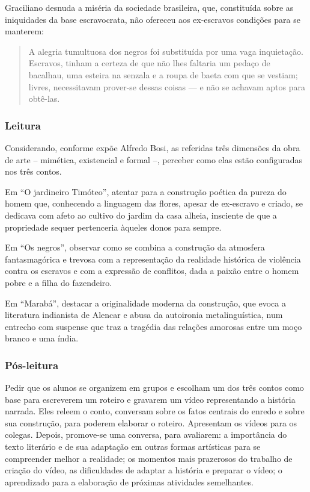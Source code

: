 \documentclass[12pt]{extarticle}
\begin{document}
Graciliano desnuda a miséria da sociedade brasileira, que, constituída
sobre as iniquidades da base escravocrata, não ofereceu aos ex-escravos
condições para se manterem:

\begin{quote}
A alegria tumultuosa dos negros foi substituída por uma vaga
inquietação. Escravos, tinham a certeza de que não lhes faltaria um
pedaço de bacalhau, uma esteira na senzala e a roupa de baeta com que se
vestiam; livres, necessitavam prover-se dessas coisas --- e não se
achavam aptos para obtê-las.
\end{quote}

\subsubsection{Leitura}

Considerando, conforme expõe Alfredo Bosi, as referidas três dimensões
da obra de arte -- mimética, existencial e formal --, perceber como elas
estão configuradas nos três contos.

Em ``O jardineiro Timóteo'', atentar para a construção poética da pureza
do homem que, conhecendo a linguagem das flores, apesar de ex-escravo e
criado, se dedicava com afeto ao cultivo do jardim da casa alheia,
insciente de que a propriedade sequer pertenceria àqueles donos para
sempre.

Em ``Os negros'', observar como se combina a construção da atmosfera
fantasmagórica e trevosa com a representação da realidade histórica de
violência contra os escravos e com a expressão de conflitos, dada a
paixão entre o homem pobre e a filha do fazendeiro.

Em ``Marabá'', destacar a originalidade moderna da construção, que evoca
a literatura indianista de Alencar e abusa da autoironia
metalinguística, num entrecho com suspense que traz a tragédia das
relações amorosas entre um moço branco e uma índia.

\subsubsection{Pós-leitura}

Pedir que os alunos se organizem em grupos e escolham um dos três contos
como base para escreverem um roteiro e gravarem um vídeo representando a
história narrada. Eles releem o conto, conversam sobre os fatos centrais
do enredo e sobre sua construção, para poderem elaborar o roteiro.
Apresentam os vídeos para os colegas. Depois, promove-se uma conversa,
para avaliarem: a importância do texto literário e de sua adaptação em
outras formas artísticas para se compreender melhor a realidade; os
momentos mais prazerosos do trabalho de criação do vídeo, as
dificuldades de adaptar a história e preparar o vídeo; o aprendizado
para a elaboração de próximas atividades semelhantes.
\end{document}
